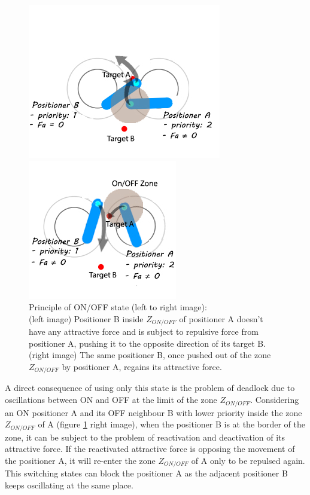 \documentclass[]{spie}  %
\begin{document}
	\begin{figure}[H]
		\centering
		\begin{minipage}[t]{6.5cm}
			\includegraphics[scale=0.54]{images/first_state_0.jpg}
		\end{minipage}
		\begin{minipage}[t]{5cm}
			\includegraphics[scale=0.54]{images/first_state_ONOFF2.jpg}
		\end{minipage}
		\caption{\centering Principle of ON/OFF state (left to right image): \\
			(left image) Positioner B inside  $Z_{ON/OFF}$ of positioner A doesn't have any attractive force and is subject to repulsive force from positioner A, pushing it to the opposite direction of its target B. (right image) The same positioner B, once pushed out of the zone $Z_{ON/OFF}$  by positioner A, regains its attractive force.\\
\label{key}			}
		\label{First_state}
	\end{figure}
	
	A direct consequence of using only this state is the problem of deadlock due to oscillations between ON and OFF at the limit of the zone $Z_{ON/OFF}$. Considering an ON positioner A and its OFF neighbour B with lower priority inside the zone $Z_{ON/OFF}$ of A (figure \ref{First_state} right image), when the positioner B is at the border of the zone, it can be subject to the problem of reactivation and deactivation of its attractive force. If the reactivated attractive force is opposing the movement of the positioner A, it will re-enter the zone $Z_{ON/OFF}$ of A only to be repulsed again. This switching states can block the positioner A as the adjacent positioner B keeps oscillating at the same place.\\
	
\end{document}
